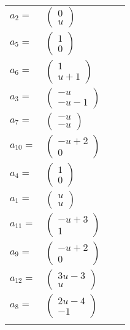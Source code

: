 \documentclass[1p]{elsarticle_modified}
\theoremstyle{definition}
\begin{document}
\begin{tabular}{m{7pt} m{180pt} m{7pt} m{180pt} }
\flushright $a_{2}=$&$\begin{pmatrix}0\\u\end{pmatrix}$ \\
\flushright $a_{5}=$&$\begin{pmatrix}1\\0\end{pmatrix}$ \\
\flushright $a_{6}=$&$\begin{pmatrix}1\\u+1\end{pmatrix}$ \\
\flushright $a_{3}=$&$\begin{pmatrix}- u\\- u-1\end{pmatrix}$ \\
\flushright $a_{7}=$&$\begin{pmatrix}- u\\- u\end{pmatrix}$ \\
\flushright $a_{10}=$&$\begin{pmatrix}- u+2\\0\end{pmatrix}$ \\
\flushright $a_{4}=$&$\begin{pmatrix}1\\0\end{pmatrix}$ \\
\flushright $a_{1}=$&$\begin{pmatrix}u\\u\end{pmatrix}$ \\
\flushright $a_{11}=$&$\begin{pmatrix}- u+3\\1\end{pmatrix}$ \\
\flushright $a_{9}=$&$\begin{pmatrix}- u+2\\0\end{pmatrix}$ \\
\flushright $a_{12}=$&$\begin{pmatrix}3 u-3\\u\end{pmatrix}$ \\
\flushright $a_{8}=$&$\begin{pmatrix}2 u-4\\-1\end{pmatrix}$\\&\end{tabular}
\end{document}
